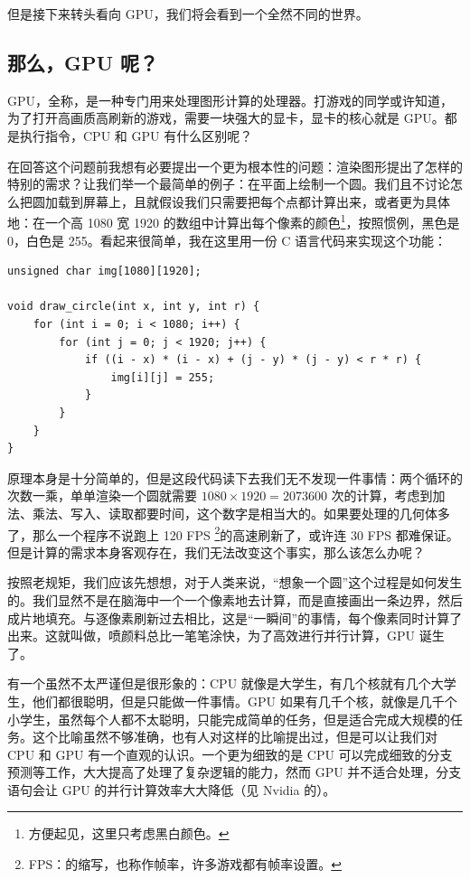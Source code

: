 但是接下来转头看向 GPU，我们将会看到一个全然不同的世界。

\newpage

\subsection{那么，GPU 呢？}

GPU，全称，是一种专门用来处理图形计算的处理器。打游戏的同学或许知道，为了打开高画质高刷新的游戏，需要一块强大的显卡，显卡的核心就是 GPU。都是执行指令，CPU 和 GPU 有什么区别呢？

在回答这个问题前我想有必要提出一个更为根本性的问题：渲染图形提出了怎样的特别的需求？让我们举一个最简单的例子：在平面上绘制一个圆。我们且不讨论怎么把圆加载到屏幕上，且就假设我们只需要把每个点都计算出来，或者更为具体地：在一个高 1080 宽 1920 的数组中计算出每个像素的颜色\footnote{方便起见，这里只考虑黑白颜色。}，按照惯例，黑色是 0，白色是 255。看起来很简单，我在这里用一份 C 语言代码来实现这个功能：
\begin{verbatim}
unsigned char img[1080][1920];

void draw_circle(int x, int y, int r) {
    for (int i = 0; i < 1080; i++) {
        for (int j = 0; j < 1920; j++) {
            if ((i - x) * (i - x) + (j - y) * (j - y) < r * r) {
                img[i][j] = 255;
            }
        }
    }
}
\end{verbatim}

原理本身是十分简单的，但是这段代码读下去我们无不发现一件事情：两个循环的次数一乘，单单渲染一个圆就需要 $1080 \times 1920 = 2073600$ 次的计算，考虑到加法、乘法、写入、读取都要时间，这个数字是相当大的。如果要处理的几何体多了，那么一个程序不说跑上 120 FPS \footnote{FPS：的缩写，也称作帧率，许多游戏都有帧率设置。}的高速刷新了，或许连 30 FPS 都难保证。但是计算的需求本身客观存在，我们无法改变这个事实，那么该怎么办呢？

按照老规矩，我们应该先想想，对于人类来说，“想象一个圆”这个过程是如何发生的。我们显然不是在脑海中一个一个像素地去计算，而是直接画出一条边界，然后成片地填充。与逐像素刷新过去相比，这是“一瞬间”的事情，每个像素同时计算了出来。这就叫做，喷颜料总比一笔笔涂快，为了高效进行并行计算，GPU 诞生了。

有一个虽然不太严谨但是很形象的：CPU 就像是大学生，有几个核就有几个大学生，他们都很聪明，但是只能做一件事情。GPU 如果有几千个核，就像是几千个小学生，虽然每个人都不太聪明，只能完成简单的任务，但是适合完成大规模的任务。这个比喻虽然不够准确，也有人对这样的比喻提出过，但是可以让我们对 CPU 和 GPU 有一个直观的认识。一个更为细致的是 CPU 可以完成细致的分支预测等工作，大大提高了处理了复杂逻辑的能力，然而 GPU 并不适合处理，分支语句会让 GPU 的并行计算效率大大降低（见 Nvidia 的）。

